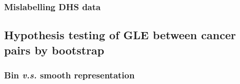 \subsubsection{Mislabelling DHS data}

\subsection{Hypothesis testing of GLE between cancer pairs by bootstrap}\label{methods:bootstrap}


\subsubsection{Bin \textit{v.s.} smooth representation}

